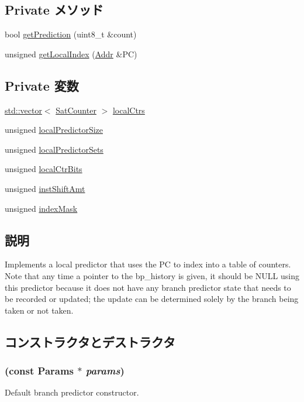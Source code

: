 \subsection*{Private メソッド}
\begin{DoxyCompactItemize}
\item 
bool \hyperlink{classLocalBP_ad0f11a4da5ded93ef111f9d8a1d40a54}{getPrediction} (uint8\_\-t \&count)
\item 
unsigned \hyperlink{classLocalBP_a60ccaea333f32c53f3645a2f7c7e6737}{getLocalIndex} (\hyperlink{base_2types_8hh_af1bb03d6a4ee096394a6749f0a169232}{Addr} \&PC)
\end{DoxyCompactItemize}
\subsection*{Private 変数}
\begin{DoxyCompactItemize}
\item 
\hyperlink{classstd_1_1vector}{std::vector}$<$ \hyperlink{classSatCounter}{SatCounter} $>$ \hyperlink{classLocalBP_a639a100e0452520604d19db58d98721d}{localCtrs}
\item 
unsigned \hyperlink{classLocalBP_ad980634448337df2bf521bc96fd5653d}{localPredictorSize}
\item 
unsigned \hyperlink{classLocalBP_a82806c3c6e4b9e285b11f8739a692665}{localPredictorSets}
\item 
unsigned \hyperlink{classLocalBP_a815998927bcd79afe7f787b90f9954f5}{localCtrBits}
\item 
unsigned \hyperlink{classLocalBP_a8ad2ee60a6143561753205840ad144e7}{instShiftAmt}
\item 
unsigned \hyperlink{classLocalBP_af74847baefa86f9623cf55bb28803c99}{indexMask}
\end{DoxyCompactItemize}


\subsection{説明}
Implements a local predictor that uses the PC to index into a table of counters. Note that any time a pointer to the bp\_\-history is given, it should be NULL using this predictor because it does not have any branch predictor state that needs to be recorded or updated; the update can be determined solely by the branch being taken or not taken. 

\subsection{コンストラクタとデストラクタ}
\hypertarget{classLocalBP_aec0c0965d267585d311300273d8976d0}{
\subsubsection[{LocalBP}]{ (const {\bf Params} $\ast$ {\em params})}}
\label{classLocalBP_aec0c0965d267585d311300273d8976d0}
Default branch predictor constructor. 



